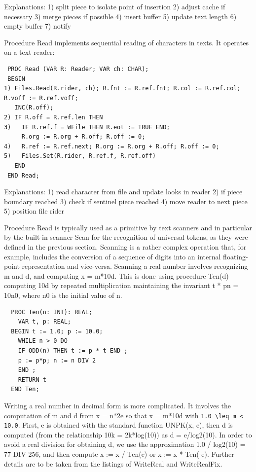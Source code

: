 Explanations:
1) split piece to isolate point of insertion
2) adjust cache if necessary
3) merge pieces if possible
4) insert buffer
5) update text length
6) empty buffer
7) notify

Procedure Read implements sequential reading of characters in texts. It operates on a text reader:
\begin{verbatim}
 PROC Read (VAR R: Reader; VAR ch: CHAR);
 BEGIN
1) Files.Read(R.rider, ch); R.fnt := R.ref.fnt; R.col := R.ref.col; R.voff := R.ref.voff;
   INC(R.off);
2) IF R.off = R.ref.len THEN
3)   IF R.ref.f = WFile THEN R.eot := TRUE END;
     R.org := R.org + R.off; R.off := 0;
4)   R.ref := R.ref.next; R.org := R.org + R.off; R.off := 0;
5)   Files.Set(R.rider, R.ref.f, R.ref.off)
   END
 END Read;
\end{verbatim}

Explanations:
1) read character from file and update looks in reader
2) if piece boundary reached
3) check if sentinel piece reached
4) move reader to next piece
5) position file rider

Procedure Read is typically used as a primitive by text scanners and in particular by the built-in
scanner Scan for the recognition of universal tokens, as they were defined in the previous section.
Scanning is a rather complex operation that, for example, includes the conversion of a sequence of
digits into an internal floating-point representation and vice-versa. Scanning a real number involves
recognizing m and d, and computing x = m*10d. This is done using procedure Ten(d) computing 10d
by repeated multiplication maintaining the invariant t * pn = 10n0, where n0 is the initial value of n.
\begin{verbatim}
  PROC Ten(n: INT): REAL;
    VAR t, p: REAL;
  BEGIN t := 1.0; p := 10.0;
    WHILE n > 0 DO
    IF ODD(n) THEN t := p * t END ;
    p := p*p; n := n DIV 2
    END ;
    RETURN t
  END Ten;
\end{verbatim}

Writing a real number in decimal form is more complicated. It involves the computation of m and d
from x = n*2e so that x = m*10d with \verb|1.0 \leq m < 10.0|. First, e is obtained with the standard function
UNPK(x, e), then d is computed (from the relationship 10k = 2k*log(10)) as d = e/log2(10). In order to
avoid a real division for obtaining d, we use the approximation 1.0 / log2(10) = 77 DIV 256, and then
compute x := x / Ten(e) or x := x * Ten(-e). Further details are to be taken from the listings of
WriteReal and WriteRealFix.

